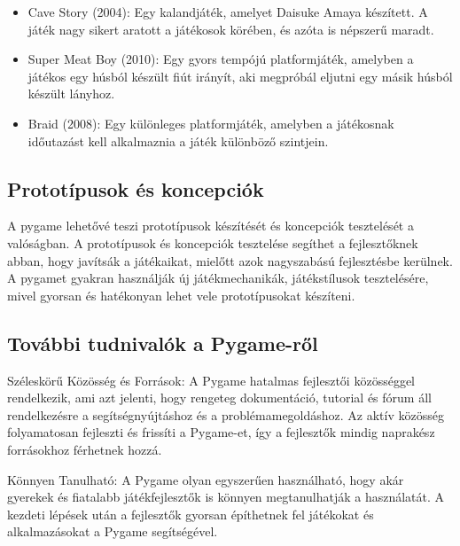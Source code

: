 \begin{itemize}
    \item Cave Story (2004): Egy kalandjáték, amelyet Daisuke Amaya készített. A játék nagy sikert aratott a játékosok körében, és azóta is népszerű maradt. \cite{CaveStory}
    \item Super Meat Boy (2010): Egy gyors tempójú platformjáték, amelyben a játékos egy húsból készült fiút irányít, aki megpróbál eljutni egy másik húsból készült lányhoz.\cite{SuperMeatBoy}
    \item Braid (2008): Egy különleges platformjáték, amelyben a játékosnak időutazást kell alkalmaznia a játék különböző szintjein.\cite{Braid}
\end{itemize}


\subsection{Prototípusok és koncepciók}
\indent \indent A pygame lehetővé teszi prototípusok készítését és koncepciók tesztelését a valóságban. A prototípusok és koncepciók tesztelése segíthet a fejlesztőknek abban, hogy javítsák a játékaikat, mielőtt azok nagyszabású fejlesztésbe kerülnek. A pygamet gyakran használják új játékmechanikák, játékstílusok tesztelésére, mivel gyorsan és hatékonyan lehet vele prototípusokat készíteni.

\subsection{További tudnivalók a Pygame-ről}

\indent \indent Széleskörű Közösség és Források:
A Pygame hatalmas fejlesztői közösséggel rendelkezik, ami azt jelenti, hogy rengeteg dokumentáció, tutorial és fórum áll rendelkezésre a segítségnyújtáshoz és a problémamegoldáshoz. Az aktív közösség folyamatosan fejleszti és frissíti a Pygame-et, így a fejlesztők mindig naprakész forrásokhoz férhetnek hozzá.

Könnyen Tanulható:
A Pygame olyan egyszerűen használható, hogy akár gyerekek és fiatalabb játékfejlesztők is könnyen megtanulhatják a használatát. A kezdeti lépések után a fejlesztők gyorsan építhetnek fel játékokat és alkalmazásokat a Pygame segítségével.


